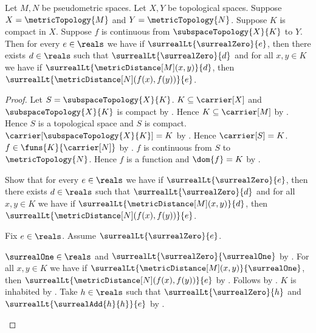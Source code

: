 \begin{theorem}\label{compact_metric_continuous_map_is_uniformly_continuous}
    Let $M,N$ be pseudometric spaces.
    Let $X,Y$ be topological spaces.
    Suppose $X=\metricTopology{M}$ and $Y=\metricTopology{N}$.
    Suppose $K$ is compact in $X$.
    Suppose $f$ is continuous from
        $\subspaceTopology{X}{K}$ to $Y$.
    Then for every $e\in\reals$ we have if
        $\surrealLt{\surrealZero}{e}$, then there exists $d\in\reals$
        such that $\surrealLt{\surrealZero}{d}$ and for all $x,y\in K$
        we have if $\surrealLt{\metricDistance[M](x,y)}{d}$, then
        $\surrealLt{\metricDistance[N](f(x),f(y))}{e}$.
\end{theorem}
\begin{proof}
    Let $S=\subspaceTopology{X}{K}$.
    $K\subseteq\carrier[X]$ and $\subspaceTopology{X}{K}$ is compact by
        .
    Hence $K\subseteq\carrier[M]$ by
        .
    Hence $S$ is a topological space and $S$ is compact.
    $\carrier[\subspaceTopology{X}{K}]=K$ by
        .
    Hence $\carrier[S]=K$.
    $f\in\funs{K}{\carrier[N]}$ by
        .
    $f$ is continuous from $S$ to $\metricTopology{N}$.
    Hence $f$ is a function and $\dom{f}=K$ by
        .

    Show that for every $e\in\reals$ we have if
        $\surrealLt{\surrealZero}{e}$, then there exists $d\in\reals$
        such that $\surrealLt{\surrealZero}{d}$ and for all $x,y\in K$
        we have if $\surrealLt{\metricDistance[M](x,y)}{d}$, then
        $\surrealLt{\metricDistance[N](f(x),f(y))}{e}$.
    \begin{subproof}
        Fix $e\in\reals$.
        Assume $\surrealLt{\surrealZero}{e}$.
        \begin{byCase}
            $\surrealOne\in\reals$ and
                $\surrealLt{\surrealZero}{\surrealOne}$ by
                .
            For all $x,y\in K$ we have if
                $\surrealLt{\metricDistance[M](x,y)}{\surrealOne}$,
                then $\surrealLt{\metricDistance[N](f(x),f(y))}{e}$
                by .
            Follows by \auto.
            $K$ is inhabited by .
            Take $h\in\reals$ such that
                $\surrealLt{\surrealZero}{h}$ and
                $\surrealLt{\surrealAdd{h}{h}}{e}$ by
                .


\end{byCase}
\end{subproof}
\end{proof}
